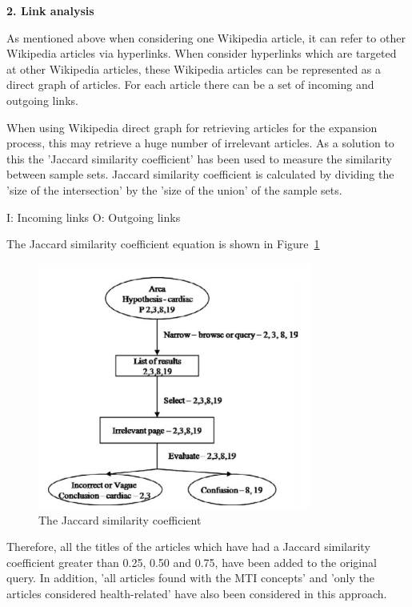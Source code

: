 \documentclass[]{article}
\begin{document}
\textbf{2. Link analysis}

As mentioned above when considering one Wikipedia article, it can refer to other Wikipedia articles via hyperlinks. When consider hyperlinks which are targeted at other Wikipedia articles, these Wikipedia articles can be represented as a direct graph of articles. For each article there can be a set of incoming and outgoing links.   

When using Wikipedia direct graph for retrieving articles for the expansion process, this may retrieve a huge number of irrelevant articles. As a solution to this the 'Jaccard similarity coefficient' has been used to measure the similarity between sample sets. Jaccard similarity coefficient is calculated by dividing the 'size of the intersection' by the 'size of the union' of the sample sets.       

I: Incoming links 
O: Outgoing links

The Jaccard similarity coefficient equation is shown in Figure~\ref{fig12}

\begin{figure}[t!]
	\includegraphics[width=0.8\textwidth]{Capture12.png}
	\caption{The Jaccard similarity coefficient \label{fig12}}
\end{figure} 

Therefore, all the titles of the articles which have had a Jaccard similarity coefficient greater than 0.25, 0.50 and 0.75, have been added to the original query. In addition, 'all articles found with the MTI concepts' and 'only the articles considered health-related' have also been considered in this approach.   
\end{document}
